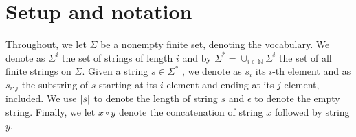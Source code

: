 
\section{Setup and notation}
\label{sec:theory:setup} 

Throughout, we let $\Sigma$ be a nonempty finite set, denoting the vocabulary. We denote as $\Sigma^i$ the set of strings of length $i$ and  by $\Sigma^{*} = \cup_{i \in \mathbb{N}} \Sigma^i$ the set of all finite strings on $\Sigma$. Given a string $s \in \Sigma^{*}$
, we denote as $s_i$ its $i$-th element and as $s_{i:j}$ the substring of $s$ starting at its $i$-element and ending at its $j$-element, included. 
We use 
$\left| s \right|$ to denote the length of string $s$ and
$\epsilon$ to denote the empty string. 
Finally, we let $x \circ y$ denote the concatenation of string $x$ followed by string $y$.

